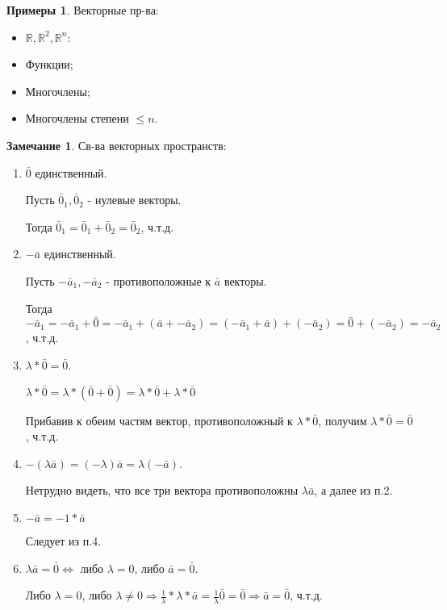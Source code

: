 \documentclass[a4paper, 12pt]{article}
\theoremstyle{definition}
\newtheorem*{remark}{Замечание}
\newtheorem*{examples}{Примеры}
\begin{document}
	\begin{examples}
		Векторные пр-ва:
		\begin{itemize}
			\item $\mathbb{R}, \mathbb{R}^2, \mathbb{R}^n$:
			\item Функции;
			\item Многочлены;
			\item Многочлены степени $\leqslant n$.
		\end{itemize}
	\end{examples}
	\begin{remark}
		Св-ва векторных пространств:
		
		\begin{enumerate}
			
			\item $\bar{0}$ единственный.
			
			Пусть $\bar{0}_{1}, \bar{0}_{2}$ - нулевые векторы.
			
			Тогда $\bar{0}_{1} = \bar{0}_{1} + \bar{0}_{2} = \bar{0}_{2}$, ч.т.д.
			\item $-\bar{a}$ единственный.
			
			Пусть $-\bar{a}_{1}, -\bar{a}_{2}$ - противоположные к $\bar{a}$ векторы.
			
			Тогда $-\bar{a}_{1} = -\bar{a}_{1} + \bar{0} = -\bar{a}_{1} + (\bar{a} + -\bar{a}_{2}) = (-\bar{a}_{1} + \bar{a}) + (-\bar{a}_{2}) = \bar{0} + (-\bar{a}_{2}) = -\bar{a}_{2}$, ч.т.д.
			\item $\lambda * \bar{0} = \bar{0}$.
			
			$\lambda * \bar{0} = \lambda * (\bar{0} + \bar{0}) = \lambda * \bar{0} + \lambda * \bar{0}$
			
			Прибавив к обеим частям вектор, противоположный к $\lambda * \bar{0}$, получим $\lambda * \bar{0} = \bar{0}$, ч.т.д.
			\item $-(\lambda\bar{a}) = (-\lambda)\bar{a} = \lambda(-\bar{a})$.
			
			Нетрудно видеть, что все три вектора противоположны $\lambda\bar{a}$, а далее из п.2.
			\item $-\bar{a} = -1*\bar{a}$
			
			Следует из п.4.
			\item $\lambda\bar{a} = \bar{0} \Leftrightarrow$ либо $\lambda = 0$, либо $\bar{a} = \bar{0}$.
			
			Либо $\lambda = 0$, либо $\lambda \neq 0 \Rightarrow \frac{1}{\lambda}*\lambda*\bar{a} = \frac{1}{\lambda}\bar{0} = \bar{0} \Rightarrow \bar{a} = \bar{0}$, ч.т.д. 
		\end{enumerate}
	\end{remark}
\end{document}
